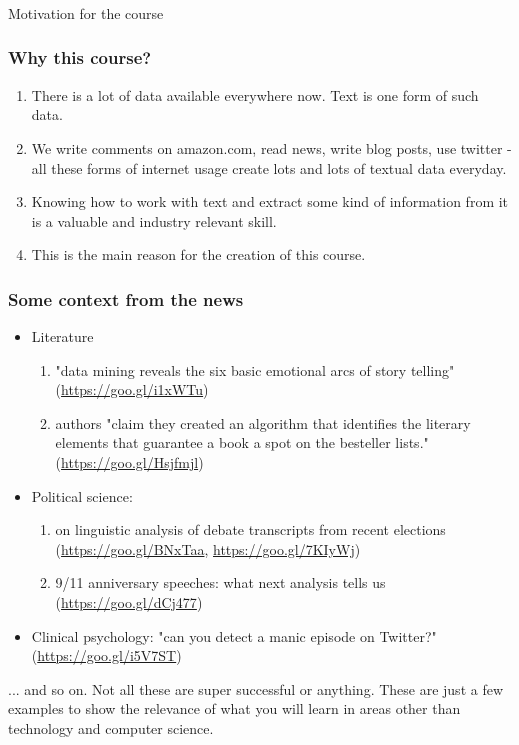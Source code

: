 \documentclass{beamer}
\begin{document}
\begin{frame}
\frametitle{}
\begin{center}
\Large Motivation for the course
\end{center}
\end{frame}

\begin{frame}
\frametitle{Why this course?}
\begin{enumerate}
\item There is a lot of data available everywhere now. Text is one form of such data.
\item We write comments on amazon.com, read news, write blog posts, use twitter - all these forms of internet usage create lots and lots of textual data everyday.
\item Knowing how to work with text and extract some kind of information from it is a valuable and industry relevant skill.
\item This is the main reason for the creation of this course.
\end{enumerate}
\end{frame}

\begin{frame}
\frametitle{Some context from the news}
\begin{itemize}
\item Literature
\begin{enumerate}
\item "data mining reveals the six basic emotional arcs of story telling" (\url{https://goo.gl/i1xWTu})
\item authors "claim they created an algorithm that identifies the literary elements that guarantee a book a spot on the besteller lists." (\url{https://goo.gl/Hsjfmjl})
\end{enumerate}
\item Political science:
\begin{enumerate}
\item on linguistic analysis of debate transcripts from recent elections (\url{https://goo.gl/BNxTaa}, \url{https://goo.gl/7KIyWj})
\item 9/11 anniversary speeches: what next analysis tells us (\url{https://goo.gl/dCj477})
\end{enumerate}
\item Clinical psychology: "can you detect a manic episode on Twitter?" (\url{https://goo.gl/i5V7ST})
\end{itemize}
\small ... and so on. Not all these are super successful or anything. These are just a few examples to show the relevance of what you will learn in areas other than technology and computer science. 
\end{frame}
\end{document}
